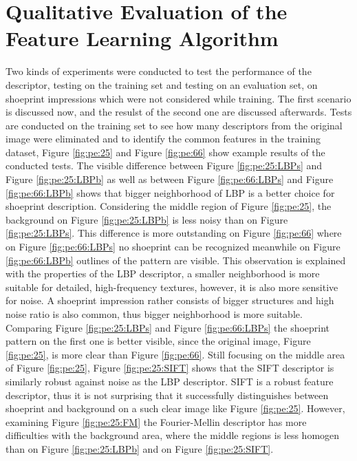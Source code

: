 \documentclass[draft,final]{vutinfth} %
\begin{document}
\section{Qualitative Evaluation of the Feature Learning Algorithm}
\par
Two kinds of experiments were conducted to test the performance of the descriptor, testing on the training set and testing on an evaluation set, on shoeprint impressions which were not considered while training.
The first scenario is discussed now, and the resulst of the second one are discussed afterwards.
Tests are conducted on the training set to see how many descriptors from the original image were eliminated and to identify the common features in the training dataset, Figure \ref{fig:pe:25} and Figure \ref{fig:pe:66} show example results of the conducted tests.
The visible difference between Figure \ref{fig:pe:25:LBPs} and Figure \ref{fig:pe:25:LBPb} as well as between Figure \ref{fig:pe:66:LBPs} and Figure \ref{fig:pe:66:LBPb} shows that bigger neighborhood of LBP is a better choice for shoeprint description.
Considering the middle region of Figure \ref{fig:pe:25}, the background on Figure \ref{fig:pe:25:LBPb} is less noisy than on Figure \ref{fig:pe:25:LBPs}.
This difference is more outstanding on  Figure \ref{fig:pe:66} where on Figure \ref{fig:pe:66:LBPs} no shoeprint can be recognized meanwhile on Figure \ref{fig:pe:66:LBPb} outlines of the pattern are visible.
This observation is explained with the properties of the LBP descriptor, a smaller neighborhood is more suitable for detailed, high-frequency textures, however, it is also more sensitive for noise.
A shoeprint impression rather consists of bigger structures and high noise ratio is also common, thus bigger neighborhood is more suitable.
Comparing Figure \ref{fig:pe:25:LBPs} and Figure \ref{fig:pe:66:LBPs} the shoeprint pattern on the first one is better visible, since the original image, Figure \ref{fig:pe:25}, is more clear than Figure \ref{fig:pe:66}.
Still focusing on the middle area of Figure \ref{fig:pe:25}, Figure \ref{fig:pe:25:SIFT} shows that the SIFT descriptor is similarly robust against noise as the LBP descriptor.
SIFT is a robust feature descriptor, thus it is not surprising that it successfully distinguishes between shoeprint and background on a such clear image like Figure \ref{fig:pe:25}.
However, examining Figure  \ref{fig:pe:25:FM} the Fourier-Mellin descriptor has more difficulties with the background area, where the middle regions is less homogen than on  Figure \ref{fig:pe:25:LBPb} and on Figure \ref{fig:pe:25:SIFT}.
\end{document}
